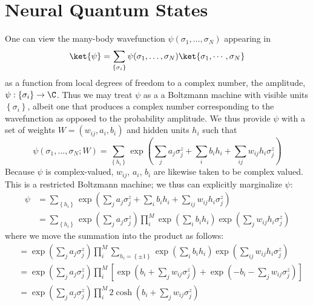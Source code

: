 \documentclass{article}
\begin{document}
\section{Neural Quantum States}
One can view the many-body wavefunction $ \psi(\sigma_1, \dots, \sigma_N) $ 
appearing in 
\begin{equation*}
	\ket{\psi} = \sum_{\left\{\sigma_i\right\}} \psi(\sigma_1, \dots,\sigma_N)
		\ket{\sigma_1,\cdots, \sigma_N }
\end{equation*}
as a function from local degrees of freedom to a complex number, the amplitude, 
$ \psi : \left\{\sigma_i\right\} \to \C $. Thus we may treat $ \psi $ as a 
a Boltzmann machine with visible units $ \left\{\sigma_i\right\} $, albeit 
one that produces a complex number corresponding to the wavefunction as opposed 
to the probability amplitude. We thus provide $ \psi $ with a set of weights 
$ W = (w_{ij}, a_i, b_i)$ and hidden units $ h_i $ such that 
\begin{equation*}
	\psi(\sigma_1, \dots, \sigma_N; W)
		= \sum_{\left\{h_i\right\}}
			\exp\left(\sum_j a_j \sigma_j^z + \sum_i b_i h_i 
					+\sum_{ij} w_{ij} h_i \sigma_j^z \right)
\end{equation*}
Because $ \psi $ is complex-valued, $ w_{ij} $, $ a_i $, $ b_i $ are likewise 
taken to be complex valued. This is a restricted Boltzmann machine; we thus 
can explicitly marginalize $ \psi $:
\begin{align*}
	\psi 
		&= \sum_{\left\{ h_i \right\}}
			\exp\left(\sum_j a_j \sigma_j^z + \sum_i b_i h_i 
					+\sum_{ij} w_{ij} h_i \sigma_j^z \right)\\
	    &= \sum_{\left\{ h_i \right\}}
			\exp\left(\sum_j a_j \sigma_j^z\right) 
			\prod_i^M \exp\left(\sum_i b_i h_i\right) 
						\exp\left(\sum_j w_{ij} h_i \sigma_j^z\right)
\end{align*}
where we move the summation into the product as follows: 
\begin{align*}
	&= \exp \left( \sum_j a_j \sigma_j^z \right)
		\prod_i^M \sum_{h_i = \left\{ \pm 1 \right\}} 
			\exp\left(\sum_i b_i h_i\right)
			\exp\left(\sum_{ij} w_{ij} h_i \sigma_j^z\right) 
	\\ 
	&= \exp\left(\sum_j a_j \sigma_j^z \right)
	\prod_i^M \left[
		\exp\left(b_i + \sum_j w_{ij} \sigma_j^z \right)
		+ \exp\left(-b_i - \sum_j w_{ij} \sigma_j^z \right)
	\right]
	\\
	&= \exp\left(\sum_j a_j \sigma_j^z \right)
		\prod_i^M 2\cosh\left(b_i +\sum_{j} w_{ij} \sigma_j^z\right)
\end{align*}
\end{document}
